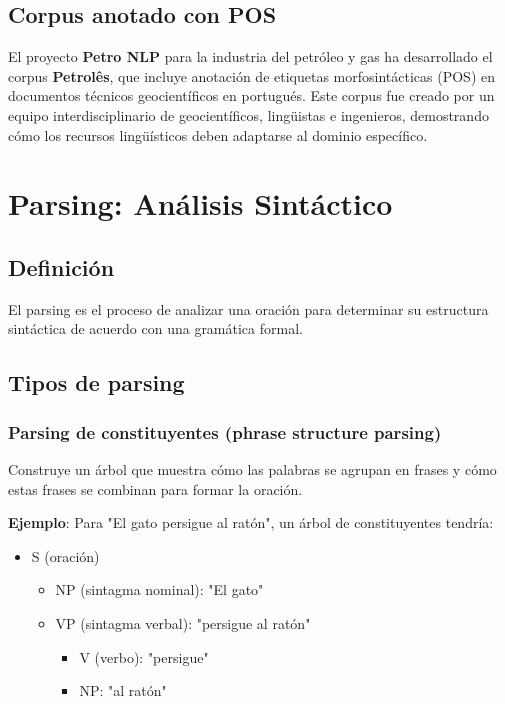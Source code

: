 \documentclass[12pt,a4paper,openany,oneside]{book}
\begin{document}
\subsection{Corpus anotado con POS}
El proyecto \textbf{Petro NLP} para la industria del petróleo y gas ha desarrollado el corpus \textbf{Petrolês}, que incluye anotación de etiquetas morfosintácticas (POS) en documentos técnicos geocientíficos en portugués. Este corpus fue creado por un equipo interdisciplinario de geocientíficos, lingüistas e ingenieros, demostrando cómo los recursos lingüísticos deben adaptarse al dominio específico.

\section{Parsing: Análisis Sintáctico}

\subsection{Definición}
El parsing es el proceso de analizar una oración para determinar su estructura sintáctica de acuerdo con una gramática formal.

\subsection{Tipos de parsing}

\subsubsection{Parsing de constituyentes (phrase structure parsing)}
Construye un árbol que muestra cómo las palabras se agrupan en frases y cómo estas frases se combinan para formar la oración.

\textbf{Ejemplo}: Para "El gato persigue al ratón", un árbol de constituyentes tendría:
\begin{itemize}
    \item S (oración)
    \begin{itemize}
        \item NP (sintagma nominal): "El gato"
        \item VP (sintagma verbal): "persigue al ratón"
        \begin{itemize}
            \item V (verbo): "persigue"
            \item NP: "al ratón"
        \end{itemize}
    \end{itemize}
\end{itemize}
\end{document}
